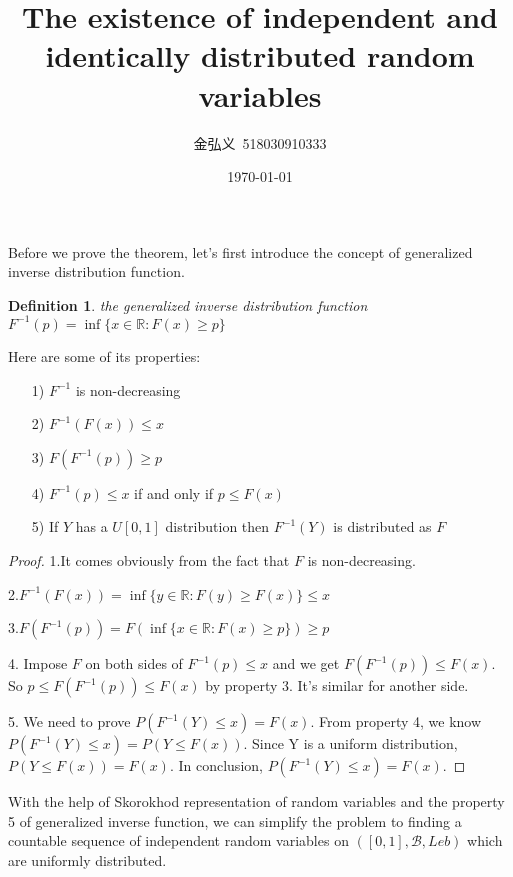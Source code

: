 \documentclass[a4paper, linespread=1.5]{article}
\newtheorem{definition}[theorem]{Definition}
\begin{document}
    \title{ The existence of independent and identically distributed random variables }
    \author{金弘义\ 518030910333}
    \date{\today}
    \maketitle

    Before we prove the theorem, let's first introduce the concept of generalized inverse distribution function.
    \begin{definition}
        the generalized inverse distribution function $F^{-1}(p)=\inf\{x\in\mathbb{R}:F(x)\ge p\}$
    \end{definition}
    Here are some of its properties:
    \begin{itemize}
        \item [1)] $F^{-1}$ is non-decreasing
        \item [2)] $F^{-1}(F(x))\le x$
        \item [3)] $F(F^{-1}(p))\ge p$
        \item [4)] $F^{-1}(p)\le x$ if and only if $p\le F(x)$
        \item [5)] If $Y$ has a $U[0,1]$ distribution then $F^{-1}(Y)$ is distributed as $F$
    \end{itemize}
    \begin{proof}
        1.It comes obviously from the fact that $F$ is non-decreasing.

        2.$F^{-1}(F(x))=\inf\{y\in\mathbb{R}:F(y)\ge F(x)\} \le x$

        3.$F(F^{-1}(p))=F(\inf\{x\in\mathbb{R}:F(x)\ge p\}) \ge p$

        4. Impose $F$ on both sides of $F^{-1}(p)\le x$ and we get $F(F^{-1}(p))\le F(x)$.
            So $p\le F(F^{-1}(p))\le F(x)$ by property 3.
            It's similar for another side.

        5. We need to prove $P(F^{-1}(Y)\le x)=F(x)$.
        From property 4, we know $P(F^{-1}(Y)\le x)=P(Y\le F(x))$.
        Since Y is a uniform distribution, $P(Y\le F(x))=F(x)$.
        In conclusion, $P(F^{-1}(Y)\le x)=F(x)$.
    \end{proof}
    With the help of Skorokhod representation of random variables and the property 5 of generalized inverse function, we can simplify the problem to finding a countable sequence of independent random variables on $([0,1],\mathcal{B},Leb)$ which are uniformly distributed.
\end{document}
